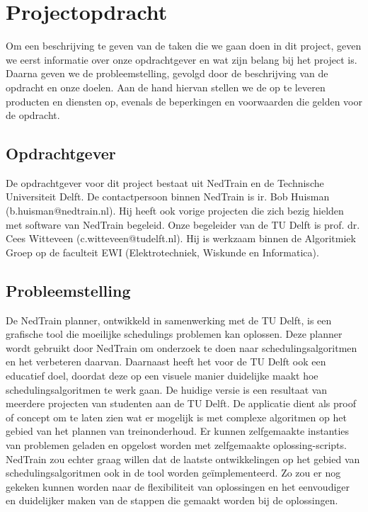 \section{Projectopdracht}
Om een beschrijving te geven van de taken die we gaan doen in dit project, geven we eerst informatie over onze opdrachtgever en wat zijn belang bij het project is. Daarna geven we de probleemstelling, gevolgd door de beschrijving van de opdracht en onze doelen. Aan de hand hiervan stellen we de op te leveren producten en diensten op, evenals de beperkingen en voorwaarden die gelden voor de opdracht.

\subsection{Opdrachtgever}
De opdrachtgever voor dit project bestaat uit NedTrain en de Technische Universiteit Delft.
De contactpersoon binnen NedTrain is ir. Bob Huisman (b.huisman@nedtrain.nl). Hij heeft ook vorige projecten die zich bezig hielden met software van NedTrain begeleid. Onze begeleider van de TU Delft is prof. dr. Cees Witteveen (c.witteveen@tudelft.nl). Hij is werkzaam binnen de Algoritmiek Groep op de faculteit EWI (Elektrotechniek, Wiskunde en Informatica).

\subsection{Probleemstelling}
De NedTrain planner, ontwikkeld in samenwerking met de TU Delft, is een grafische tool die moeilijke schedulings problemen kan oplossen. Deze planner wordt gebruikt door NedTrain om onderzoek te doen naar schedulingsalgoritmen en het verbeteren daarvan. Daarnaast heeft het voor de TU Delft ook een educatief doel, doordat deze op een visuele manier duidelijke maakt hoe schedulingsalgoritmen te werk gaan. De huidige versie is een resultaat van meerdere projecten van studenten aan de TU Delft. De applicatie dient als proof of concept om te laten zien wat er mogelijk is met complexe algoritmen op het gebied van het plannen van treinonderhoud. Er kunnen zelfgemaakte instanties van problemen geladen en opgelost worden met zelfgemaakte oplossing-scripts. NedTrain zou echter graag willen dat de laatste ontwikkelingen op het gebied van schedulingsalgoritmen ook in de tool worden ge\"implementeerd. Zo zou er nog gekeken kunnen worden naar de flexibiliteit van oplossingen en het eenvoudiger en duidelijker maken van de stappen die gemaakt worden bij de oplossingen. 

